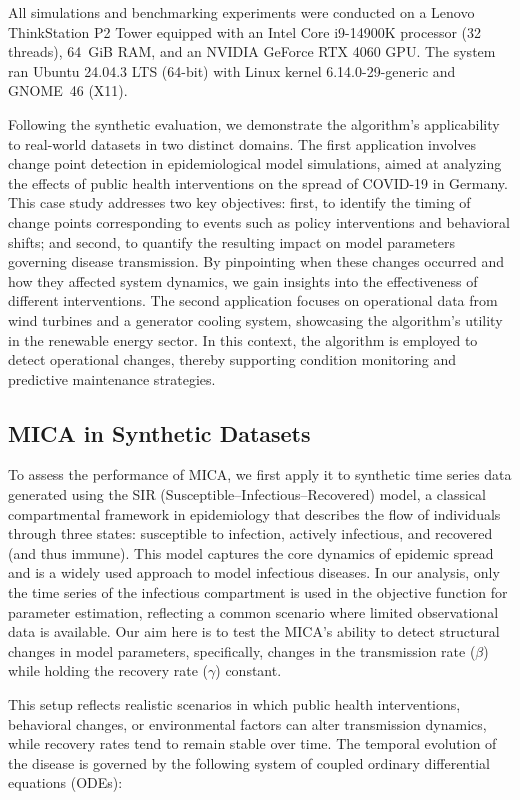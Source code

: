 \documentclass[10pt,letterpaper]{article}
\begin{document}
All simulations and benchmarking experiments were conducted on a Lenovo ThinkStation P2 Tower equipped with an Intel Core i9-14900K processor (32 threads), 64~GiB RAM, and an NVIDIA GeForce RTX 4060 GPU. The system ran Ubuntu 24.04.3 LTS (64-bit) with Linux kernel 6.14.0-29-generic and GNOME~46 (X11). 

Following the synthetic evaluation, we demonstrate the algorithm’s applicability to real-world datasets in two distinct domains. The first application involves change point detection in epidemiological model simulations, aimed at analyzing the effects of public health interventions on the spread of COVID-19 in Germany. This case study addresses two key objectives: first, to identify the timing of change points corresponding to events such as policy interventions and behavioral shifts; and second, to quantify the resulting impact on model parameters governing disease transmission. By pinpointing when these changes occurred and how they affected system dynamics, we gain insights into the effectiveness of different interventions. The second application focuses on operational data from wind turbines and a generator cooling system, showcasing the algorithm’s utility in the renewable energy sector. In this context, the algorithm is employed to detect operational changes, thereby supporting condition monitoring and predictive maintenance strategies. 

\subsection*{MICA in Synthetic Datasets}
To assess the performance of MICA, we first apply it to synthetic time series data generated using the SIR (Susceptible–Infectious–Recovered) model, a classical compartmental framework in epidemiology that describes the flow of individuals through three states: susceptible to infection, actively infectious, and recovered (and thus immune). This model captures the core dynamics of epidemic spread and is a widely used approach to model infectious diseases. In our analysis, only the time series of the infectious compartment is used in the objective function for parameter estimation, reflecting a common scenario where limited observational data is available. 
Our aim here is to test the MICA's ability to detect structural changes in model parameters, specifically, changes in the transmission rate (\(\beta\)) while holding the recovery rate (\(\gamma\)) constant.

This setup reflects realistic scenarios in which public health interventions, behavioral changes, or environmental factors can alter transmission dynamics, while recovery rates tend to remain stable over time. The temporal evolution of the disease is governed by the following system of coupled ordinary differential equations (ODEs):
\end{document}
